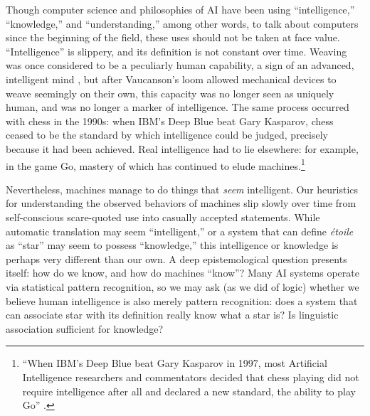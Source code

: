 Though computer science and philosophies of AI have been using
``intelligence,'' ``knowledge,'' and ``understanding,'' among other
words, to talk about computers since the beginning of the field, these
uses should not be taken at face value. ``Intelligence'' is slippery,
and its definition is not constant over time. Weaving was once considered to be a
peculiarly human capability, a sign of an advanced, intelligent
mind \cite[p. 627]{riskinDuck}, but after Vaucanson's loom allowed mechanical devices to weave
seemingly on their own, this capacity was no longer seen as uniquely
human, and was no longer a marker of intelligence. The same process
occurred with chess in the 1990s: when IBM's Deep Blue beat Gary
Kasparov, chess ceased to be the standard by which intelligence could
be judged, precisely because it had been achieved. Real intelligence
had to lie elsewhere: for example, in the game Go, mastery of which
has continued to elude machines.\footnote{``When IBM's Deep Blue beat
  Gary Kasparov in 1997, most Artificial Intelligence researchers and
  commentators decided that chess playing did not require intelligence
  after all and declared a new standard, the ability to play Go'' \cite[p. 623]{riskinDuck}.}

Nevertheless, machines manage to do things that \emph{seem}
intelligent. Our heuristics for understanding the observed 
behaviors of machines slip slowly over time from self-conscious
scare-quoted use into casually accepted statements. While automatic
translation may seem ``intelligent,'' or a system that can define \emph{\'{e}toile}
as ``star'' may seem to possess ``knowledge,'' this intelligence or
knowledge is perhaps very different than our own. A deep
epistemological question presents itself: how do we know, and how do
machines ``know''? Many AI systems operate via statistical pattern
recognition, so we may ask (as we did of logic) whether we believe human intelligence is
also merely pattern recognition: does a system that can associate star
with its definition really know what a star is? Is linguistic
association sufficient for knowledge?


